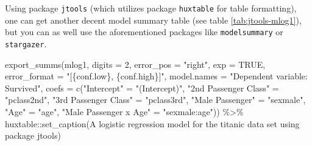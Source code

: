 \documentclass[
  11pt,
  a4paper,
  twoside]{scrbook}
\newenvironment{Shaded}{\begin{snugshade}}{\end{snugshade}}
\newcommand{\AttributeTok}[1]{\textcolor[rgb]{0.77,0.63,0.00}{#1}}
\newcommand{\ConstantTok}[1]{\textcolor[rgb]{0.00,0.00,0.00}{#1}}
\newcommand{\DecValTok}[1]{\textcolor[rgb]{0.00,0.00,0.81}{#1}}
\newcommand{\FunctionTok}[1]{\textcolor[rgb]{0.00,0.00,0.00}{#1}}
\newcommand{\NormalTok}[1]{#1}
\newcommand{\OtherTok}[1]{\textcolor[rgb]{0.56,0.35,0.01}{#1}}
\newcommand{\SpecialCharTok}[1]{\textcolor[rgb]{0.00,0.00,0.00}{#1}}
\newcommand{\StringTok}[1]{\textcolor[rgb]{0.31,0.60,0.02}{#1}}
\begin{document}
Using package \texttt{jtools} (which utilizes package \texttt{huxtable} for table formatting), one can get another decent model summary table (see table \ref{tab:jtools-mlog1}), but you can as well use the aforementioned packages like \texttt{modelsummary} or \texttt{stargazer}.

\linespread{1}

\begin{Shaded}
\begin{Highlighting}[]
\FunctionTok{export\_summs}\NormalTok{(mlog1, }\AttributeTok{digits =} \DecValTok{2}\NormalTok{, }\AttributeTok{error\_pos =} \StringTok{"right"}\NormalTok{, }\AttributeTok{exp =} \ConstantTok{TRUE}\NormalTok{,}
             \AttributeTok{error\_format =} \StringTok{"[\{conf.low\}, \{conf.high\}]"}\NormalTok{,}
             \AttributeTok{model.names =} \StringTok{"Dependent variable: Survived"}\NormalTok{,}
             \AttributeTok{coefs =} \FunctionTok{c}\NormalTok{(}\StringTok{"Intercept"} \OtherTok{=} \StringTok{"(Intercept)"}\NormalTok{,}
                       \StringTok{"2nd Passenger Class"} \OtherTok{=} \StringTok{"pclass2nd"}\NormalTok{,}
                       \StringTok{"3rd Passenger Class"} \OtherTok{=} \StringTok{"pclass3rd"}\NormalTok{,}
                       \StringTok{"Male Passenger"} \OtherTok{=} \StringTok{"sexmale"}\NormalTok{,}
                       \StringTok{"Age"} \OtherTok{=} \StringTok{"age"}\NormalTok{,}
                       \StringTok{"Male Passenger x Age"} \OtherTok{=} \StringTok{"sexmale:age"}\NormalTok{)) }\SpecialCharTok{\%\textgreater{}\%} 
\NormalTok{  huxtable}\SpecialCharTok{::}\FunctionTok{set\_caption}\NormalTok{(}\StringTok{\textquotesingle{}A logistic regression model for the titanic data set using package jtools\textquotesingle{}}\NormalTok{)}
\end{Highlighting}
\end{Shaded}

\linespread{1}

 
  \providecommand{\huxb}[2]{\arrayrulecolor[RGB]{#1}\global\arrayrulewidth=#2pt}
  \providecommand{\huxvb}[2]{\color[RGB]{#1}\vrule width #2pt}
  \providecommand{\huxtpad}[1]{\rule{0pt}{#1}}
  \providecommand{\huxbpad}[1]{\rule[-#1]{0pt}{#1}}
\end{document}

